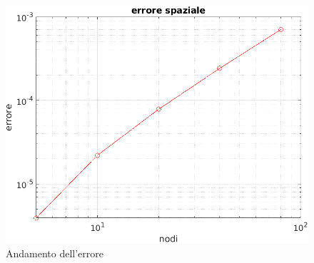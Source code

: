 \documentclass[]{article}
\begin{document}
\begin{figure}[H]
	\centering
	\includegraphics[totalheight=8cm]{errore_es2.png}
	\caption{Andamento dell'errore}
	\label{fig:verticalcell}
\end{figure}
\end{document}
